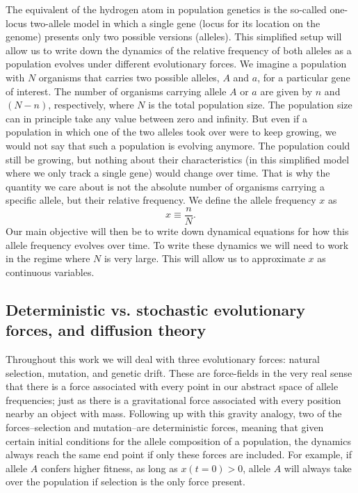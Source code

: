 The equivalent of the hydrogen atom in population genetics is the so-called
one-locus two-allele model in which a single gene (locus for its location on the
genome) presents only two possible versions (alleles). This simplified setup
will allow us to write down the dynamics of the relative frequency of both
alleles as a population evolves under different evolutionary forces. We imagine
a population with $N$ organisms that carries two possible alleles, $A$ and $a$,
for a particular gene of interest. The number of organisms carrying allele $A$
or $a$ are given by $n$ and $(N - n)$, respectively, where $N$ is the total
population size. The population size can in principle take any value between
zero and infinity. But even if a population in which one of the two alleles took
over were to keep growing, we would not say that such a population is evolving
anymore. The population could still be growing, but nothing about their
characteristics (in this simplified model where we only track a single gene)
would change over time. That is why the quantity we care about is not the
absolute number of organisms carrying a specific allele, but their relative
frequency. We define the allele frequency $x$ as
\begin{equation}
    x \equiv \frac{n}{N}.
\end{equation}
Our main objective will then be to write down dynamical equations for how this
allele frequency evolves over time. To write these dynamics we will need to work
in the regime where $N$ is very large. This will allow us to approximate $x$ as
continuous variables.

\subsection{Deterministic vs. stochastic evolutionary forces, and diffusion 
theory}

Throughout this work we will deal with three evolutionary forces: natural
selection, mutation, and genetic drift. These are force-fields in the very real
sense that there is a force associated with every point in our abstract space of
allele frequencies; just as there is a gravitational force associated with every
position nearby an object with mass. Following up with this gravity analogy, two
of the forces--selection and mutation--are deterministic forces, meaning that
given certain initial conditions for the allele composition of a population, the
dynamics always reach the same end point if only these forces are included. For
example, if allele $A$ confers higher fitness, as long as $x(t = 0) > 0$, allele
$A$ will always take over the population if selection is the only force present.

